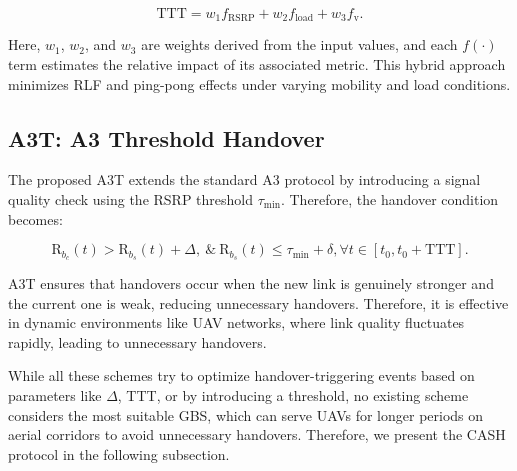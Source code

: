 \documentclass[10pt,conference]{IEEEtran}
\begin{document}



\begin{equation}
\mathrm{TTT} = w_1 f_{\mathrm{RSRP}} + w_2 f_{\mathrm{load}} + w_3 f_{\mathrm{v}}.
\end{equation}

Here, $w_1$, $w_2$, and $w_3$ are weights derived from the input values, and each $f(\cdot)$ term estimates the relative impact of its associated metric. This hybrid approach minimizes RLF and ping-pong effects under varying mobility and load conditions.



\subsection{A3T: A3 Threshold Handover}

The proposed A3T extends the standard A3 protocol by introducing a signal quality check using the RSRP threshold $\tau_{\min}$. Therefore, the handover condition becomes:

\begin{equation}
\label{a3teq}
\text{R}_{b_c}(t) > \text{R}_{b_s}(t) + \Delta, \: \text{\&} \: \text{R}_{b_s}(t) \leq \tau_{\min} + \delta,  \forall t \in [t_0, t_0 + \mathrm{TTT}].
\end{equation}

A3T ensures that handovers occur when the new link is genuinely stronger and the current one is weak, reducing unnecessary handovers. Therefore, it is effective in dynamic environments like UAV networks, where link quality fluctuates rapidly, leading to unnecessary handovers.

While all these schemes try to optimize handover-triggering events based on parameters like $\Delta$, TTT, or by introducing a threshold, no existing scheme considers the most suitable GBS, which can serve UAVs for longer periods on aerial corridors to avoid unnecessary handovers. Therefore, we present the CASH protocol in the following subsection.   
\end{document}

